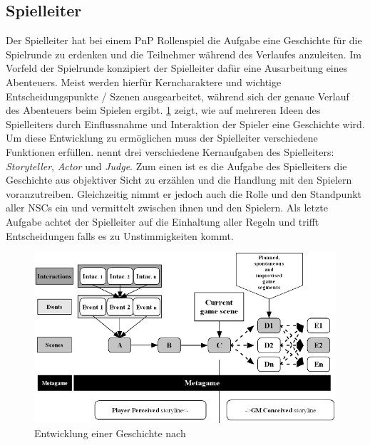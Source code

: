 \subsection{Spielleiter}
\label{sec:Spielleiter}
Der Spielleiter hat bei einem PnP Rollenspiel die Aufgabe eine Geschichte für die Spielrunde zu erdenken und die Teilnehmer während des Verlaufes anzuleiten. Im Vorfeld der Spielrunde konzipiert der Spielleiter dafür eine Ausarbeitung eines Abenteuers. Meist werden hierfür Kerncharaktere und wichtige Entscheidungspunkte / Szenen ausgearbeitet, während sich der genaue Verlauf des Abenteuers beim Spielen ergibt. \ref{fig:storyflow_pnp} zeigt, wie auf mehreren Ideen des Spielleiters durch Einflussnahme und Interaktion der Spieler eine Geschichte wird. Um diese Entwicklung zu ermöglichen muss der Spielleiter verschiedene Funktionen erfüllen.\newline
\cite{Arinbjarnar} nennt drei verschiedene Kernaufgaben des Spielleiters: \emph{Storyteller}, \emph{Actor} und \emph{Judge}. Zum einen ist es die Aufgabe des Spielleiters die Geschichte aus objektiver Sicht zu erzählen und die Handlung mit den Spielern voranzutreiben. Gleichzeitig nimmt er jedoch auch die Rolle und den Standpunkt aller NSCs ein und vermittelt zwischen ihnen und den Spielern. Als letzte Aufgabe achtet der Spielleiter auf die Einhaltung aller Regeln und trifft Entscheidungen falls es zu Unstimmigkeiten kommt.
\begin{figure}
	\centering
		\includegraphics[width=1.00\textwidth]{media/storyflow_pnp.png}
	\caption{Entwicklung einer Geschichte nach \cite{Tychsen2006a}}
	\label{fig:storyflow_pnp}
\end{figure}




